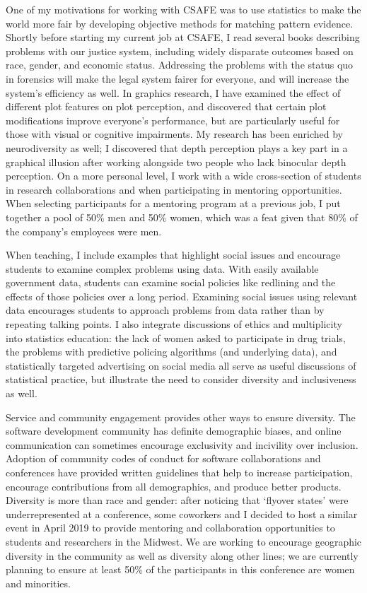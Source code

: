 \documentclass[12pt, letterpaper, sans]{moderncv}
\begin{document}
One of my motivations for working with CSAFE was to use statistics to make the world more fair by developing objective methods for matching pattern evidence. Shortly before starting my current job at CSAFE, I read several books describing problems with our justice system, including widely disparate outcomes based on race, gender, and economic status. Addressing the problems with the status quo in forensics will make the legal system fairer for everyone, and will increase the system's efficiency as well. In graphics research, I have examined the effect of different plot features on plot perception, and discovered that certain plot modifications improve everyone's performance, but are particularly useful for those with visual or cognitive impairments. My research has been enriched by neurodiversity as well; I discovered that depth perception plays a key part in a graphical illusion after working alongside two people who lack binocular depth perception. On a more personal level, I work with a wide cross-section of students in research collaborations and when participating in mentoring opportunities. When selecting participants for a mentoring program at a previous job, I put together a pool of 50\% men and 50\% women, which was a feat given that 80\% of the company's employees were men.

When teaching, I include examples that highlight social issues and encourage students to examine complex problems using data. With easily available government data, students can examine social policies like redlining and the effects of those policies over a long period. Examining social issues using relevant data encourages students to approach problems from data rather than by repeating talking points. I also integrate discussions of ethics and multiplicity into statistics education: the lack of women asked to participate in drug trials, the problems with predictive policing algorithms (and underlying data), and statistically targeted advertising on social media all serve as useful discussions of statistical practice, but illustrate the need to consider diversity and inclusiveness as well. 

Service and community engagement provides other ways to ensure diversity. The software development community has definite demographic biases, and online communication can sometimes encourage exclusivity and incivility over inclusion. Adoption of community codes of conduct for software collaborations and conferences have provided written guidelines that help to increase participation, encourage contributions from all demographics, and produce better products. Diversity is more than race and gender: after noticing that `flyover states' were underrepresented at a conference, some coworkers and I decided to host a similar event in April 2019 to provide mentoring and collaboration opportunities to students and researchers in the Midwest. We are working to encourage geographic diversity in the community as well as diversity along other lines; we are currently planning to ensure at least 50\% of the participants in this conference are women and minorities. 
\end{document}
